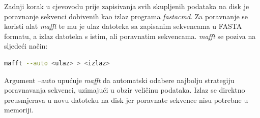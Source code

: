 Zadnji korak u cjevovodu prije zapisivanja svih skupljenih podataka na disk je
poravnanje sekvenci dobivenih kao izlaz programa \emph{fastacmd}. Za poravnanje
se koristi alat \emph{mafft}\cite{mafft} te mu je ulaz datoteka sa zapisanim sekvencama u FASTA
formatu, a izlaz datoteka s istim, ali poravnatim sekvencama. \emph{mafft} se
poziva na sljedeći način:
\begin{lstlisting}[language=bash]
mafft --auto <ulaz> > <izlaz>
\end{lstlisting} 
Argument --auto upućuje \emph{mafft} da automatski odabere najbolju strategiju
poravnavanja sekvenci, uzimajući u obzir veličinu podataka. Izlaz se direktno
preusmjerava u novu datoteku na disk jer poravnate sekvence nisu potrebne u
memoriji.




